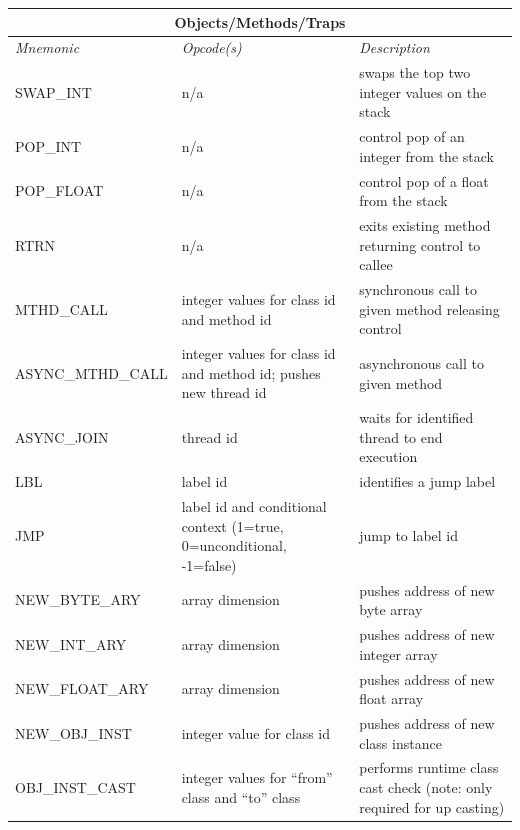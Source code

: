 \documentclass[12pt]{article}
\begin{document}
\begin{center}
\vspace{\baselineskip}
\begin{tabular}{| l | p{4 cm} | p{6 cm} |}
\hline
\multicolumn{3}{|c|}{\textbf{Objects/Methods/Traps}} \\
\hline
\emph{Mnemonic}  &  \emph{Opcode(s)}  &  \emph{Description} \\ \hline \hline
SWAP\_INT & n/a & swaps the top two integer values on the stack \\ \hline
POP\_INT & n/a & control pop of an integer from the stack \\ \hline
POP\_FLOAT & n/a & control pop of a float from the stack \\ \hline
RTRN & n/a & exits existing method returning control to callee \\ \hline
MTHD\_CALL & integer values for class id and method id & synchronous call to given method releasing control \\ \hline
ASYNC\_MTHD\_CALL & integer values for class id and method id; pushes new thread id & asynchronous call to given method \\ \hline
ASYNC\_JOIN & thread id & waits for identified thread to end execution \\ \hline
LBL & label id & identifies a jump label \\ \hline
JMP & label id and conditional context (1=true, 0=unconditional, -1=false) & jump to label id \\ \hline
NEW\_BYTE\_ARY & array dimension & pushes address of new byte array \\ \hline
NEW\_INT\_ARY & array dimension & pushes address of new integer array \\ \hline
NEW\_FLOAT\_ARY & array dimension & pushes address of new float array \\ \hline
NEW\_OBJ\_INST & integer value for class id & pushes address of new class instance \\ \hline
OBJ\_INST\_CAST & integer values for ``from'' class and ``to'' class & performs runtime class cast check (note: only required for up casting) \\ \hline
\end{tabular}


\end{center}
\end{document}
